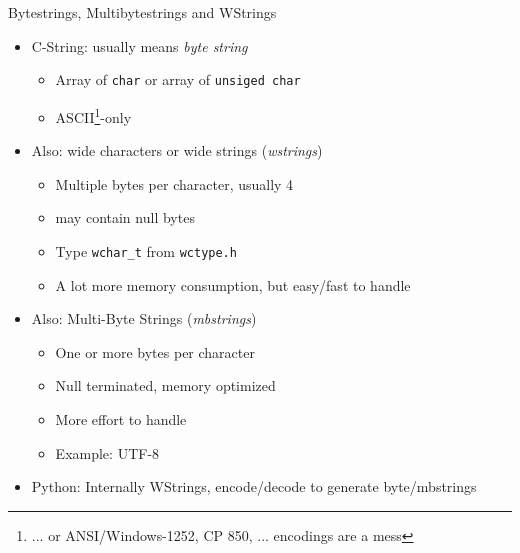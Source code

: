 \begin{frame}{Bytestrings, Multibytestrings and WStrings}
%
\begin{itemize}
\item C-String: usually means \emph{byte string}
	\begin{itemize}
	\item Array of \texttt{char} or array of \texttt{unsiged char}
	\item ASCII\footnote{... or ANSI/Windows-1252, CP 850, ... encodings are a mess}-only
	\end{itemize}
\item Also: wide characters or wide strings (\emph{wstrings})
	\begin{itemize}
	\item Multiple bytes per character, usually 4
	\item[\Thus] may contain null bytes
	\item Type \texttt{wchar\_t} from \texttt{wctype.h}
	\item A lot more memory consumption, but easy/fast to handle 
	\end{itemize}
\item Also: Multi-Byte Strings (\emph{mbstrings})
	\begin{itemize}
	\item One or more bytes per character
	\item Null terminated, memory optimized
	\item More effort to handle
	\item Example: UTF-8
	\end{itemize}
\item Python: Internally WStrings, encode/decode to generate byte/mbstrings
\end{itemize}
%
\end{frame}


